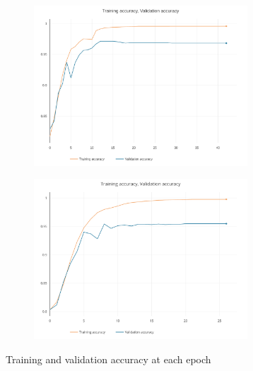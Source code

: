 \documentclass[journal]{IEEEtran}
\begin{document}
\begin{figure}[h]
	\centering

	\begin{subfigure}{0.49\textwidth}
		\centering
		\includegraphics[height = 6cm]{Images/accuracy.pdf}
	\end{subfigure}
	\hspace{1mm}
	\begin{subfigure}{0.49\textwidth}
		\centering
		\includegraphics[height = 6cm]{Images/accuracy1.pdf}
	\end{subfigure}
	
	\caption{Training and validation accuracy at each epoch}
\end{figure}
\end{document}
